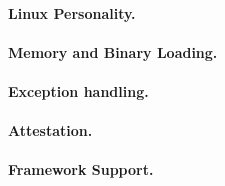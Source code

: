 \paragraph{Linux Personality.}

\paragraph{Memory and Binary Loading.}

\paragraph{Exception handling.}

\paragraph{Attestation.}

\paragraph{Framework Support.}

